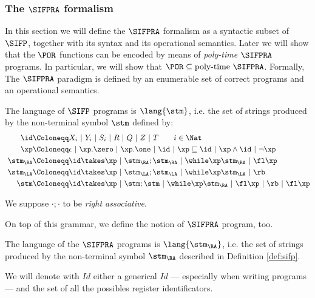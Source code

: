 \subsubsection{The $\SIFPRA$ formalism}
\label{subsub:portosifpra}
In this section we will define the $\SIFPRA$ formalism as a syntactic subset of $\SIFP$,
together with its syntax and its operational semantics. Later we will show that
the $\POR$ functions can be encoded by means of \emph{poly-time} $\SIFPRA$ programs.
In particular, we will show that $\POR \subseteq \text{poly-time }\SIFPRA$.
%
Formally, The $\SIFPRA$ paradigm is defined by an enumerable set
of correct programs and an operational semantics.

\begin{defn}
  \label{def:sifp}
The language of $\SIFP$ programs is $\lang{\stm}$, i.e.
the set of strings produced by the non-terminal symbol $\stm$ defined by:
%
\begin{align*}
\id &\Coloneqq X_i\ |\ Y_i\ |\ S_i\ |\ R\ |\ Q\ |\ Z\ |\ T\qquad i \in \Nat\\
\xp &\Coloneqq \epsilon\ |\ \xp.\zero\ |\ \xp.\one\ |\ \id\ |\ \xp \sqsubseteq \id\ |\ \xp \land \id\ |\ \lnot \xp\\
\stm_\RA & \Coloneqq \id \takes \xp\ |\ \stm_\RA;\stm_\RA\ |\ \while \xp \stm_\RA\ |\ \fl \xp\\\
\stm_\LA & \Coloneqq \id \takes \xp\ |\ \stm_\LA;\stm_\LA\ |\ \while \xp \stm_\LA\ |\ \rb\\
\stm & \Coloneqq \id \takes \xp\ |\ \stm;\stm\ |\ \while \xp \stm_\RA\ |\ \fl \xp\ |\ \rb\ |\ \fl\xp
\end{align*}
\end{defn}

\begin{notation}
  We suppose $\cdot;\cdot$ to be \emph{right associative}.
\end{notation}

On top of this grammar, we define the notion of $\SIFPRA$ program, too.

\begin{defn}[$\SIFPRA$]
  The language of the $\SIFPRA$ programs is $\lang{\stm_\RA}$, i.e. the set of strings produced by the non-terminal symbol $\stm_\RA$ described in Definition \ref{def:sifp}.
\end{defn}

\begin{notation}[$Id$]
  We will denote with $Id$ either a generical $Id$
  --- especially when writing programs --- and the set of all the possibles register
  identificators.
\end{notation}


